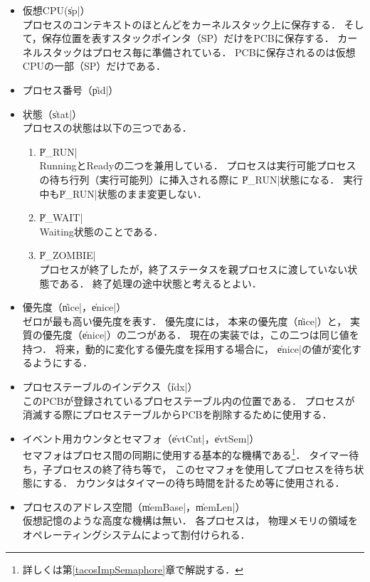 \begin{itemize}
\item 仮想CPU(\|sp|） \\
  プロセスのコンテキストのほとんどをカーネルスタック上に保存する．
  そして，保存位置を表すスタックポインタ（SP）だけをPCBに保存する．
  カーネルスタックはプロセス毎に準備されている．
  PCBに保存されるのは仮想CPUの一部（SP）だけである．
\item プロセス番号（\|pid|）
\item 状態（\|stat|） \\
  プロセスの状態は以下の三つである．
  \begin{enumerate}
  \item \|P_RUN| \\
    RunningとReadyの二つを兼用している．
    プロセスは実行可能プロセスの待ち行列（実行可能列）に挿入される際に
    \|P_RUN|状態になる．
    実行中も\|P_RUN|状態のまま変更しない．
  \item \|P_WAIT| \\
    Waiting状態のことである．
  \item \|P_ZOMBIE| \\
    プロセスが終了したが，終了ステータスを親プロセスに渡していない状態である．
    終了処理の途中状態と考えるとよい．
  \end{enumerate}
\item 優先度（\|nice|，\|enice|） \\
  ゼロが最も高い優先度を表す．
  優先度には，
  本来の優先度（\|nice|）と，
  実質の優先度（\|enice|）の二つがある．
  現在の実装では，この二つは同じ値を持つ．
  将来，動的に変化する優先度を採用する場合に，
  \|enice|の値が変化するようにする．
\item プロセステーブルのインデクス（\|idx|） \\
  このPCBが登録されているプロセステーブル内の位置である．
  プロセスが消滅する際にプロセステーブルからPCBを削除するために使用する．
\item イベント用カウンタとセマフォ（\|evtCnt|，\|evtSem|） \\
  セマフォはプロセス間の同期に使用する基本的な機構である\footnote{
    詳しくは第\ref{tacosImpSemaphore}章で解説する．}．
  タイマー待ち，子プロセスの終了待ち等で，
  このセマフォを使用してプロセスを待ち状態にする．
  カウンタはタイマーの待ち時間を計るため等に使用される．
\item プロセスのアドレス空間（\|memBase|，\|memLen|） \\
  仮想記憶のような高度な機構は無い．
  各プロセスは，
  物理メモリの領域をオペレーティングシステムによって割付けられる．

\end{itemize}
